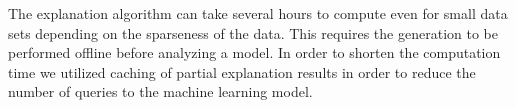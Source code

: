 %
The explanation algorithm can take several hours to compute even for small data sets depending on the sparseness of the data.
This requires the generation to be performed offline before analyzing a model.
In order to shorten the computation time we utilized caching of partial explanation results in order to reduce the number of queries to the machine learning model.
